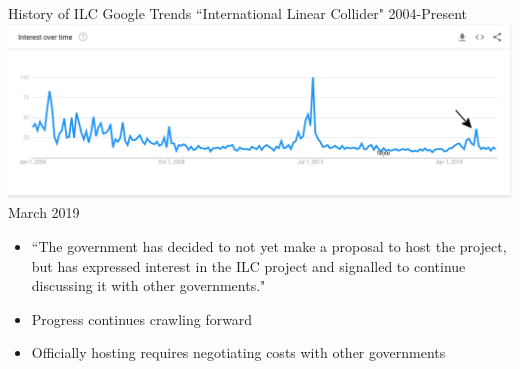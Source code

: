 \documentclass[10pt]{beamer}
\begin{document}
\begin{frame}{History of ILC}
Google Trends ``International Linear Collider" 2004-Present
\includegraphics[scale=0.25]{timeline5.png}\\
March 2019
\begin{itemize}
\item ``The government has decided to not yet make a proposal to host the project, but has expressed interest in the ILC project and signalled to continue discussing it with other governments."
\item Progress continues crawling forward
\item Officially hosting requires negotiating costs with other governments
\end{itemize}
\end{frame}
\end{document}

